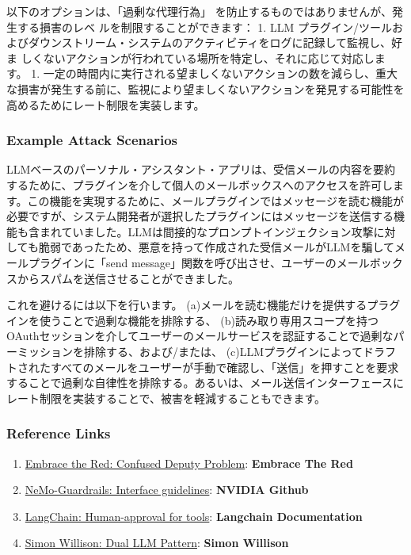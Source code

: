 \documentclass[
]{article}
\providecommand{\tightlist}{%
  \setlength{\itemsep}{0pt}\setlength{\parskip}{0pt}}
\begin{document}
以下のオプションは、「過剰な代理行為」
を防止するものではありませんが、発生する損害のレベ
ルを制限することができます： 1. LLM
プラグイン/ツールおよびダウンストリーム・システムのアクティビティをログに記録して監視し、好ま
しくないアクションが行われている場所を特定し、それに応じて対応します。
1.
一定の時間内に実行される望ましくないアクションの数を減らし、重大な損害が発生する前に、監視により望ましくないアクションを発見する可能性を高めるためにレート制限を実装します。

\subsubsection{Example Attack Scenarios}\label{example-attack-scenarios}

LLMベースのパーソナル・アシスタント・アプリは、受信メールの内容を要約するために、プラグインを介して個人のメールボックスへのアクセスを許可します。この機能を実現するために、メールプラグインではメッセージを読む機能が必要ですが、システム開発者が選択したプラグインにはメッセージを送信する機能も含まれていました。LLMは間接的なプロンプトインジェクション攻撃に対しても脆弱であったため、悪意を持って作成された受信メールがLLMを騙してメールプラグインに「send
message」関数を呼び出させ、ユーザーのメールボックスからスパムを送信させることができました。

これを避けるには以下を行います。
(a)メールを読む機能だけを提供するプラグインを使うことで過剰な機能を排除する、
(b)読み取り専用スコープを持つOAuthセッションを介してユーザーのメールサービスを認証することで過剰なパーミッションを排除する、および/または、
(c)LLMプラグインによってドラフトされたすべてのメールをユーザーが手動で確認し、「送信」を押すことを要求することで過剰な自律性を排除する。あるいは、メール送信インターフェースにレート制限を実装することで、被害を軽減することもできます。

\subsubsection{Reference Links}\label{reference-links}

\begin{enumerate}
\def\labelenumi{\arabic{enumi}.}
\tightlist
\item
  \href{https://embracethered.com/blog/posts/2023/chatgpt-cross-plugin-request-forgery-and-prompt-injection./}{Embrace
  the Red: Confused Deputy Problem}: \textbf{Embrace The Red}
\item
  \href{https://github.com/NVIDIA/NeMo-Guardrails/blob/main/docs/security/guidelines.md}{NeMo-Guardrails:
  Interface guidelines}: \textbf{NVIDIA Github}
\item
  \href{https://python.langchain.com/docs/modules/agents/tools/how_to/human_approval}{LangChain:
  Human-approval for tools}: \textbf{Langchain Documentation}
\item
  \href{https://simonwillison.net/2023/Apr/25/dual-llm-pattern/}{Simon
  Willison: Dual LLM Pattern}: \textbf{Simon Willison}
\end{enumerate}
\end{document}
